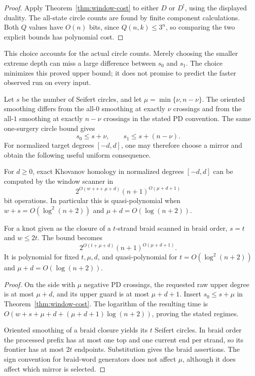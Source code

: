 \begin{proof}
Apply Theorem~\ref{thm:window-cost} to either $D$ or $D^{!}$, using the
displayed duality.  The all-state circle counts are found by finite
component calculations.  Both $Q$ values have $O(n)$ bits, since
$Q(n,k)\leq3^n$, so comparing the two explicit bounds has polynomial cost.
\end{proof}

This choice accounts for the actual circle counts.  Merely choosing the
smaller extreme depth can miss a large difference between $s_0$ and $s_1$.
The choice minimizes this proved upper bound; it does not promise to
predict the faster observed run on every input.

Let $s$ be the number of Seifert circles, and let
$\mu=\min\{\nu,n-\nu\}$.  The oriented smoothing differs from the all-$0$
smoothing at exactly $\nu$ crossings and from the all-$1$ smoothing at
exactly $n-\nu$ crossings in the stated PD convention.  The same one-surgery
circle bound gives
\[
 s_0\leq s+\nu,\qquad s_1\leq s+(n-\nu).
\]
For normalized target degrees $[-d,d]$, one may therefore choose a mirror
and obtain the following useful uniform consequence.

\begin{corollary}
\label{cor:seifert-window-cost}
For $d\geq0$, exact Khovanov homology in normalized degrees $[-d,d]$ can be
computed by the window scanner in
\begin{equation}
 2^{O(w+s+\mu+d)}(n+1)^{O(\mu+d+1)}
 \label{eq:seifert-window-cost}
\end{equation}
bit operations.  In particular this is quasi-polynomial when
$w+s=O(\log^2(n+2))$ and $\mu+d=O(\log(n+2))$.

For a knot given as the closure of a $t$-strand braid scanned in braid
order, $s=t$ and $w\leq2t$.  The bound becomes
\[
 2^{O(t+\mu+d)}(n+1)^{O(\mu+d+1)}.
\]
It is polynomial for fixed $t,\mu,d$, and quasi-polynomial for
$t=O(\log^2(n+2))$ and $\mu+d=O(\log(n+2))$.
\end{corollary}

\begin{proof}
On the side with $\mu$ negative PD crossings, the requested raw upper
degree is at most $\mu+d$, and its upper guard is at most $\mu+d+1$.
Insert $s_0\leq s+\mu$ in Theorem~\ref{thm:window-cost}.  The logarithm of
the resulting time is
$O(w+s+\mu+d+(\mu+d+1)\log(n+2))$, proving the stated regimes.

Oriented smoothing of a braid closure yields its $t$ Seifert circles.  In
braid order the processed prefix has at most one top and one current end
per strand, so its frontier has at most $2t$ endpoints.  Substitution gives
the braid assertions.  The sign convention for braid-word generators does
not affect $\mu$, although it does affect which mirror is selected.
\end{proof}

